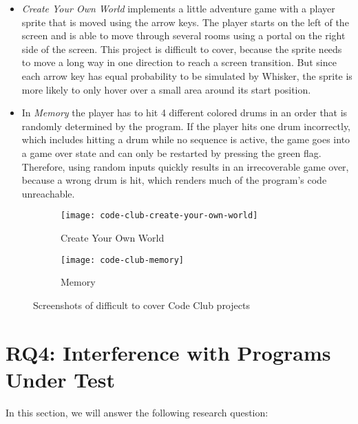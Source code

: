 \begin{itemize}
    \item \textit{Create Your Own World} implements a little adventure game with a player sprite that is moved using the arrow keys.
        The player starts on the left of the screen and is able to move through several rooms using a portal on the right side of the screen.
        This project is difficult to cover, because the sprite needs to move a long way in one direction to reach a screen transition.
        But since each arrow key has equal probability to be simulated by Whisker, the sprite is more likely to only hover over a small area around its start position.
    \item In \textit{Memory} the player has to hit 4 different colored drums in an order that is randomly determined by the program.
        If the player hits one drum incorrectly, which includes hitting a drum while no sequence is active,
        the game goes into a game over state and can only be restarted by pressing the green flag.
        Therefore, using random inputs quickly results in an irrecoverable game over,
        because a wrong drum is hit, which renders much of the program's code unreachable.
\end{itemize}

\begin{figure}[htpb]
    \centering

    \begin{subfigure}{.3\textwidth}
        \centering
        \texttt{[image: code-club-create-your-own-world]}
        \caption{Create Your Own World}
    \end{subfigure}
    \hspace{1mm}
    \begin{subfigure}{.3\textwidth}
        \centering
        \texttt{[image: code-club-memory]}
        \caption{Memory}
    \end{subfigure}%

    \caption{Screenshots of difficult to cover Code Club projects}
    \label{fig:difficult_code_club_projects}
\end{figure}

\section{RQ4: Interference with Programs Under Test}
\label{sec:rq4}

In this section, we will answer the following research question:

